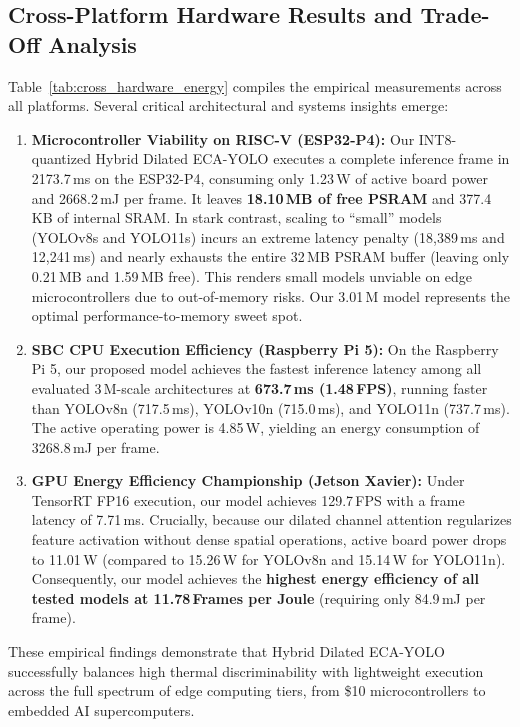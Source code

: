 \documentclass[journal,twoside,web]{ieeecolor}
\begin{document}
\subsection{Cross-Platform Hardware Results and Trade-Off Analysis}
Table~\ref{tab:cross_hardware_energy} compiles the empirical measurements across all platforms. Several critical architectural and systems insights emerge:
\begin{enumerate}
    \item \textbf{Microcontroller Viability on RISC-V (ESP32-P4):} Our INT8-quantized Hybrid Dilated ECA-YOLO executes a complete inference frame in 2173.7\,ms on the ESP32-P4, consuming only 1.23\,W of active board power and 2668.2\,mJ per frame. It leaves \textbf{18.10\,MB of free PSRAM} and 377.4\,KB of internal SRAM. In stark contrast, scaling to ``small'' models (YOLOv8s and YOLO11s) incurs an extreme latency penalty (18,389\,ms and 12,241\,ms) and nearly exhausts the entire 32\,MB PSRAM buffer (leaving only 0.21\,MB and 1.59\,MB free). This renders small models unviable on edge microcontrollers due to out-of-memory risks. Our 3.01\,M model represents the optimal performance-to-memory sweet spot.
    \item \textbf{SBC CPU Execution Efficiency (Raspberry Pi 5):} On the Raspberry Pi 5, our proposed model achieves the fastest inference latency among all evaluated 3\,M-scale architectures at \textbf{673.7\,ms (1.48\,FPS)}, running faster than YOLOv8n (717.5\,ms), YOLOv10n (715.0\,ms), and YOLO11n (737.7\,ms). The active operating power is 4.85\,W, yielding an energy consumption of 3268.8\,mJ per frame.
    \item \textbf{GPU Energy Efficiency Championship (Jetson Xavier):} Under TensorRT FP16 execution, our model achieves 129.7\,FPS with a frame latency of 7.71\,ms. Crucially, because our dilated channel attention regularizes feature activation without dense spatial operations, active board power drops to 11.01\,W (compared to 15.26\,W for YOLOv8n and 15.14\,W for YOLO11n). Consequently, our model achieves the \textbf{highest energy efficiency of all tested models at 11.78\,Frames per Joule} (requiring only 84.9\,mJ per frame).
\end{enumerate}

These empirical findings demonstrate that Hybrid Dilated ECA-YOLO successfully balances high thermal discriminability with lightweight execution across the full spectrum of edge computing tiers, from \$10 microcontrollers to embedded AI supercomputers.
\end{document}
